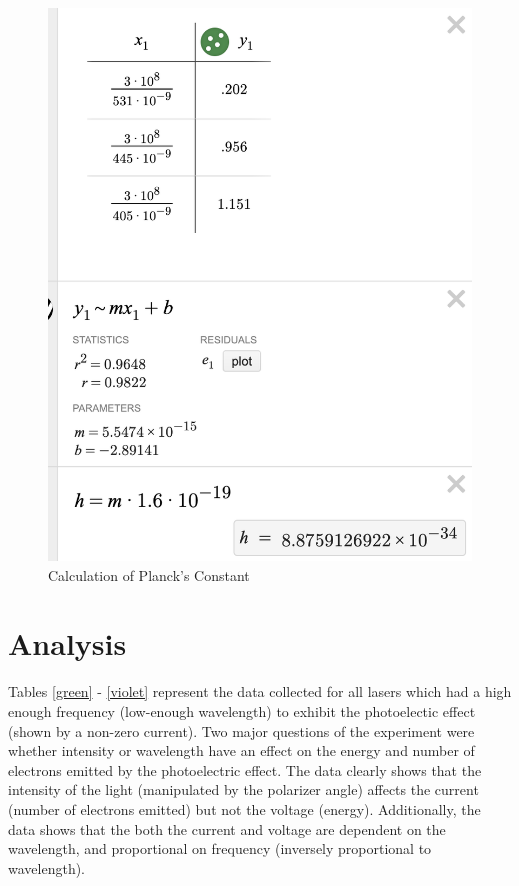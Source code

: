 \documentclass{article}[12pt]
\begin{document}
\begin{figure}[H]
\centering
\includegraphics[scale=.4]{figures/planck_calculation.png}
\caption{Calculation of Planck's Constant}
\label{planck_calc}
\end{figure}


\section{Analysis}

Tables \ref{green} - \ref{violet} represent the data collected for all lasers which had a high enough frequency (low-enough wavelength) to exhibit the photoelectic effect (shown by a non-zero current).
Two major questions of the experiment were whether intensity or wavelength have an effect on the energy and number of electrons emitted by the photoelectric effect. 
The data clearly shows that the intensity of the light (manipulated by the polarizer angle) affects the current (number of electrons emitted) but not the voltage (energy).
Additionally, the data shows that the both the current and voltage are dependent on the wavelength, and proportional on frequency (inversely proportional to wavelength).
\end{document}
